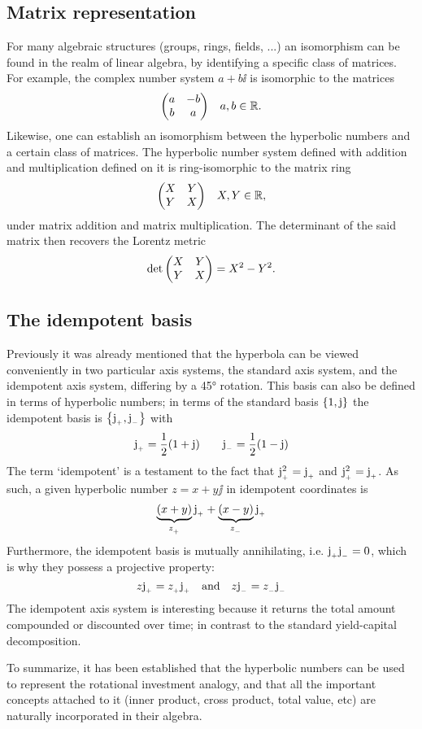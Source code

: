 \subsection{Matrix representation}
For many algebraic structures (groups, rings, fields, ...) an isomorphism can be found in the realm of linear algebra, by identifying a specific class of matrices. For example, the complex number system \(a + b\ii\) is isomorphic to the matrices
\[
     \mqty(a & -b \\ b & a) \quad a, b \in \real.
\]
Likewise, one can establish an isomorphism between the hyperbolic numbers and a certain class of matrices. The hyperbolic number system defined with addition and multiplication defined on it is ring-isomorphic to the matrix ring
\[
     \mqty(X & Y \\ Y & X) \quad X, Y \in \real,
\]
under matrix addition and matrix multiplication. The determinant of the said matrix then recovers the Lorentz metric
\[
     \det \mqty(X & Y \\ Y & X) = X^2 - Y^2.
\]

\subsection{The idempotent basis}
Previously it was already mentioned that the hyperbola can be viewed conveniently in two particular axis systems, the standard axis system, and the idempotent axis system, differing by a \ang{45} rotation. This basis can also be defined in terms of hyperbolic numbers; in terms of the standard basis \(\qty{1, \ensuremath{\mathrm{j}}}\) the idempotent basis is \(\qty{\ensuremath{\mathrm{j}_{_+}}, \ensuremath{\mathrm{j}_{_-}}}\) with 
\[
     \mathrm{j}_{_+} = \frac{1}{2}(1 + \mathrm{j}) \qquad \mathrm{j}_{_-} = \frac{1}{2}(1 - \mathrm{j})
\]
The term `idempotent' is a testament to the fact that \(\mathrm{j}_{_+}^2 = \mathrm{j}_{_+}\) and \(\mathrm{j}_{_+}^2 = \mathrm{j}_{_+}\). As such, a given hyperbolic number \(z = x + y\jj\) in idempotent coordinates is 
\[
     \underbrace{\qty(x + y)}_{z_{_+}}\mathrm{j}_{_+} + \underbrace{\qty(x - y)}_{z_{_-}}\mathrm{j}_{_+}
\]
Furthermore, the idempotent basis is mutually annihilating, i.e. \(\mathrm{j}_{_+} \mathrm{j}_{_-} = 0\), which is why they possess a projective property: \cite{Sobczyk1995}
\[
     z\mathrm{j}_{_+} = z_{_+}\mathrm{j}_{_+}\quad\text{and}\quad z\mathrm{j}_{_-} = z_{_-}\mathrm{j}_{_-}
\]
The idempotent axis system is interesting because it returns the total amount compounded or discounted over time; in contrast to the standard yield-capital decomposition.

To summarize, it has been established that the hyperbolic numbers can be used to represent the rotational investment analogy, and that all the important concepts attached to it (inner product, cross product, total value, etc) are naturally incorporated in their algebra.

